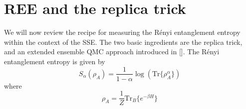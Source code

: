 \documentclass[aps,prb,reprint,floatfix]{revtex4-1}
\begin{document}
\section{REE and the replica trick}\label{app_c}
We will now review the recipe for measuring the R\'{e}nyi entanglement entropy within the context of the SSE.  The two basic ingredients are the replica trick, \cite{Melko2010:FiniteTRenyi,Hastings2010:MeasuringRenyiQMC} and an extended ensemble QMC approach introduced in [].  The R\'{e}nyi entanglement entropy is given by
{\allowdisplaybreaks
\begin{equation}
		S_{\alpha}(\rho_{A})= \frac{1}{1-\alpha}\log(\text{Tr}\{ \rho^{\alpha}_{A} \})
\label{eq:RenyiEntropy1}
\end{equation}}
where
{\allowdisplaybreaks
\begin{equation}
		\rho_{A}=\frac{1}{Z}\text{Tr}_{B}\{ e^{-\beta H} \}
\label{eq:ReducedDensityMatrix}
\end{equation}}
\end{document}
